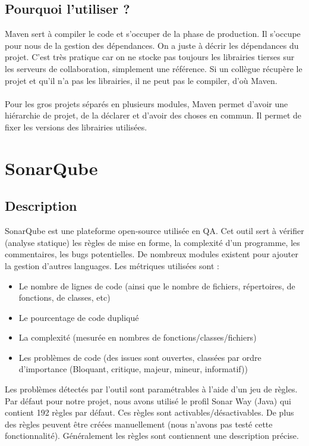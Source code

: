 \documentclass{article}
\begin{document}
\subsection{Pourquoi l'utiliser ?}
Maven sert à compiler le code et s'occuper de la phase de production. Il s'occupe pour nous de la gestion des dépendances. On a juste à décrir les dépendances du projet. C'est très pratique car on ne stocke pas toujours les librairies tierses sur les serveurs de collaboration, simplement une référence. Si un collègue récupère le projet et qu'il n'a pas les librairies, il ne peut pas le compiler, d'où Maven. \\\\
Pour les gros projets séparés en plusieurs modules, Maven permet d'avoir une hiérarchie de projet, de la déclarer et d'avoir des choses en commun. Il permet de fixer les versions des librairies utilisées.

\section{SonarQube}
\subsection{Description}
SonarQube est une plateforme open-source utilisée en QA. Cet outil sert à vérifier (analyse statique) les règles de mise en forme, la complexité d'un programme, les commentaires, les bugs potentielles. De nombreux modules existent pour ajouter la gestion d'autres languages. Les métriques utilisées sont :
\begin{itemize}
	\item Le nombre de lignes de code (ainsi que le nombre de fichiers, répertoires, de fonctions, de classes, etc)
	\item Le pourcentage de code dupliqué
	\item La complexité (mesurée en nombres de fonctions/classes/fichiers)
	\item Les problèmes de code (des issues sont ouvertes, classées par ordre d'importance (Bloquant, critique, majeur, mineur, informatif))
\end{itemize}
Les problèmes détectés par l'outil sont paramétrables à l'aide d'un jeu de règles. Par défaut pour notre projet, nous avons utilisé le profil Sonar Way (Java) qui contient 192 règles par défaut. Ces règles sont activables/désactivables. De plus des règles peuvent être créées manuellement (nous n'avons pas testé cette fonctionnalité). Généralement les règles sont contiennent une description précise.
\end{document}
